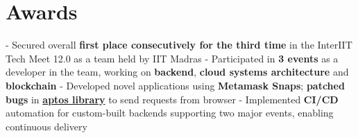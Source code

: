 \documentclass[a4paper,10pt]{extarticle} %
\begin{document}





 \vspace{+0.3cm}
\section{\textcolor{primary}{Awards}}
 \vspace{0.1cm}
\begin{description}[style=nextline, font=$\bullet$\hspace{2mm}\normalsize]

 \item[{\href{https://interiit-tech.org/}{InterIIT Tech Meet 12.0}} | Contingent Gold ] 
- Secured overall \textbf{first place consecutively for the third time} in the InterIIT Tech Meet 12.0 as a team held by IIT Madras \newline
- Participated in \textbf{3 events} as a developer in the team, working on \textbf{backend}, \textbf{cloud systems architecture} and \textbf{blockchain} \newline
- Developed novel applications using \textbf{Metamask Snaps}; \textbf{patched bugs} in \href{https://github.com/aptos-labs/aptos-core}{\textbf{aptos library}} to send requests from browser \newline
- Implemented \textbf{CI/CD} automation for custom-built backends supporting two major events, enabling continuous delivery
\end{description}

 \vspace{-0.1cm}
\end{document}

